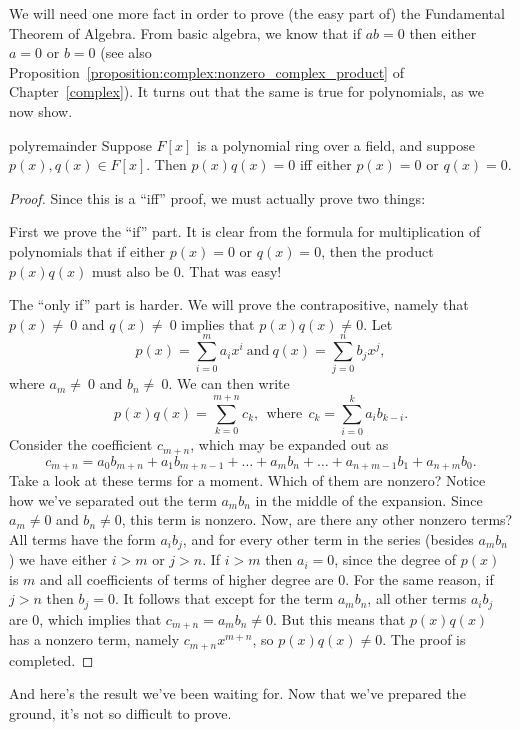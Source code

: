 We will need one more fact in order to prove (the easy part of) the Fundamental Theorem of Algebra. From basic algebra, we know that if $ab=0$ then either $a=0$ or $b=0$ (see also 
Proposition~\ref{proposition:complex:nonzero_complex_product} of Chapter~\ref{complex}).  It turns out that the same is true for polynomials, as we now show.

\begin {prop}{polyremainder}
Suppose $F[x]$ is a polynomial ring over a field, and suppose $p(x),  q(x) \in F[x]$. Then $p(x)  q(x)=0$ iff either $p(x)=0$ or $q(x)=0$.
\end {prop}
\begin {proof}
Since this is a ``iff'' proof, we must actually prove two things:  

First we prove the ``if'' part.  It is clear from the formula for multiplication of polynomials that if either $p(x)=0$ or $q(x)=0$, then the product $p(x)q(x)$ must also be 0. That was easy!

The ``only if'' part is harder. We will prove the contrapositive, namely that  $p(x)\neq\ 0$ and  $ q(x)\neq\ 0$ implies that  $p(x)q(x) \neq 0$.
Let 
\[p(x) =  \sum_{i=0}^{m} a_i x^i \mathrm{~ and ~} q(x) =  \sum_{j=0}^{n} b_j x^j,\] 
where $a_m \neq\ 0$ and $b_n\neq\ 0$.
We can then write
 \[p(x) q(x) = \sum_{k=0}^{m+n} c_k, \mathrm{~~where~~} c_{k} =  \sum_{i=0}^{k}a_i b_{k-i}.\]
Consider the coefficient $c_{m+n}$, which may be expanded out as
\[
c_{m+n} =  a_0 b_{m+n} + a_1 b_{m+n-1} + \ldots  + a_{m}b_{n} + \dots +  a_{n+m-1}b_{1} + a_{n+m}b_{0}.
\]
Take a look at these terms for a moment. Which of them are nonzero?  Notice how we've separated out the term $a_{m}b_{n}$ in the middle of the expansion. Since $a_{m} \neq 0$ and $b_{n} \neq 0$, this term is nonzero. Now, are there
any other nonzero terms?  All terms have the  form $a_i b_j$, and for every other term in the series (besides $a_{m}b_{n}$) we have either $i>m$ or $j>n$.  If $i>m$ then $a_i=0$, since the degree of $p(x)$ is $m$ and all coefficients of terms of higher degree are 0.  For the same reason, if $j>n$ then $b_j=0$. It follows that except for the term $a_{m}b_{n}$, all other terms $a_ib_j$ are 0, which implies that $c_{m+n} = a_mb_n \neq 0$. But this means that $p(x)q(x)$ has a nonzero term, namely
$c_{m+n}x^{m+n}$, so $p(x)q(x) \neq 0$.    The proof is completed.
\end{proof}

And here's the result we've been waiting for. Now that we've prepared the ground, it's not so difficult to prove.

